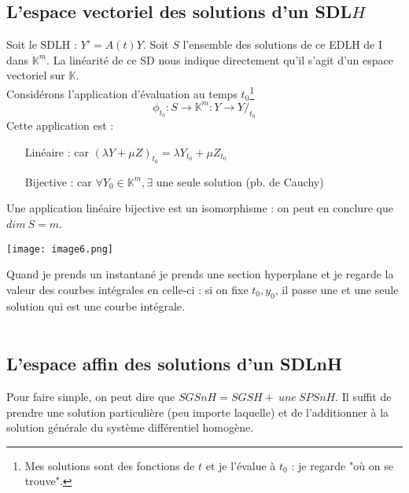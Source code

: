 \documentclass[11pt, a4paper, openany]{book}
\begin{document}
\subsection{L'espace vectoriel des solutions d'un SDL$H$}
Soit le SDLH : $Y' = A(t)Y$. Soit $S$ l'ensemble des solutions de ce EDLH de I dans $\mathbb{K}^m$. La linéarité de ce SD nous indique directement qu'il s'agit d'un espace vectoriel sur $\mathbb{K}$.\\
Considérons l'application d'évaluation au temps $t_0$\footnote{Mes solutions sont des fonctions de $t$ et je l'évalue à $t_0$ : je regarde "où on se trouve".}
\begin{equation}
	\phi_{t_0} : S \rightarrow \mathbb{K}^m : Y \rightarrow Y/_{t_0}
\end{equation}
Cette application est :
\begin{itemize}
	\item[Linéaire :] car $(\lambda Y + \mu Z)_{t_0} = \lambda Y_{t_0} + \mu Z_{t_0}$
	\item[Bijective :] car $\forall Y_0 \in \mathbb{K}^m, \exists$ une seule solution (pb. de Cauchy)
\end{itemize}
Une application linéaire bijective est un isomorphisme : on peut en conclure que $dim\ S = m$.\\
\begin{center}
	\texttt{[image: image6.png]}
\end{center}
		
Quand je prends un instantané je prends une section hyperplane et je regarde la valeur des courbes intégrales en celle-ci : si on fixe $t_0, y_0$, il passe une et une seule solution qui est une courbe intégrale.\\
		
\ \\
		
		
\subsection{L'espace affin des solutions d'un SDLnH}
Pour faire simple, on peut dire que $SGSnH = SGSH +\ une\ SPSnH$. Il suffit de prendre une solution particulière (peu importe laquelle) et de l'additionner à la solution générale du système différentiel homogène.
		
\end{document}

